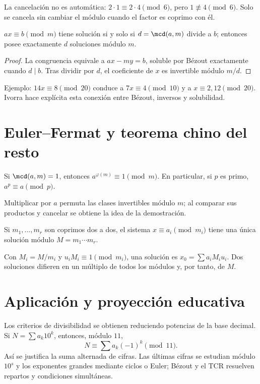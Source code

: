 \documentclass[10pt,a4paper]{article}
\begin{document}
La cancelación no es automática: $2\cdot1\equiv2\cdot4\pmod6$, pero $1\not\equiv4\pmod6$. Solo se cancela sin cambiar el módulo cuando el factor es coprimo con él.

\begin{teorema}
$ax\equiv b\pmod m$ tiene solución si y solo si $d=\mcd(a,m)$ divide a $b$; entonces posee exactamente $d$ soluciones módulo $m$.
\end{teorema}
\begin{proof}
La congruencia equivale a $ax-my=b$, soluble por Bézout exactamente cuando $d\mid b$. Tras dividir por $d$, el coeficiente de $x$ es invertible módulo $m/d$.
\end{proof}
Ejemplo: $14x\equiv8\pmod{20}$ conduce a $7x\equiv4\pmod{10}$ y a $x\equiv2,12\pmod{20}$. Ivorra hace explícita esta conexión entre Bézout, inversos y solubilidad.

\section{Euler--Fermat y teorema chino del resto}
\begin{teorema}
Si $\mcd(a,m)=1$, entonces $a^{\varphi(m)}\equiv1\pmod m$. En particular, si $p$ es primo, $a^p\equiv a\pmod p$.
\end{teorema}
Multiplicar por $a$ permuta las clases invertibles módulo $m$; al comparar sus productos y cancelar se obtiene la idea de la demostración.

\begin{teorema}
Si $m_1,\ldots,m_r$ son coprimos dos a dos, el sistema $x\equiv a_i\pmod{m_i}$ tiene una única solución módulo $M=m_1\cdots m_r$.
\end{teorema}
Con $M_i=M/m_i$ y $u_iM_i\equiv1\pmod{m_i}$, una solución es $x_0=\sum a_iM_iu_i$. Dos soluciones difieren en un múltiplo de todos los módulos y, por tanto, de $M$.

\section{Aplicación y proyección educativa}
Los criterios de divisibilidad se obtienen reduciendo potencias de la base decimal. Si $N=\sum a_k10^k$, entonces, módulo $11$,
\[
N\equiv\sum a_k(-1)^k\pmod{11}.
\]
Así se justifica la suma alternada de cifras. Las últimas cifras se estudian módulo $10^s$ y los exponentes grandes mediante ciclos o Euler; Bézout y el TCR resuelven repartos y condiciones simultáneas.
\end{document}
